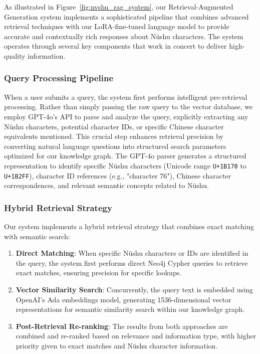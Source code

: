 \documentclass{article}
\begin{document}
    As illustrated in Figure~\ref{fig:nvshu_rag_system}, our Retrieval-Augmented Generation system implements a sophisticated pipeline that combines advanced retrieval techniques with our LoRA-fine-tuned language model to provide accurate and contextually rich responses about N\"{u}shu characters. 
    The system operates through several key components that work in concert to deliver high-quality information.
    
    \subsubsection{Query Processing Pipeline}
    When a user submits a query, the system first performs intelligent pre-retrieval processing. 
    Rather than simply passing the raw query to the vector database, we employ GPT-4o's API to parse and analyze the query, explicitly extracting any N\"{u}shu characters, potential character IDs, or specific Chinese character equivalents mentioned. 
    This crucial step enhances retrieval precision by converting natural language questions into structured search parameters optimized for our knowledge graph.
    The GPT-4o parser generates a structured representation to identify specific N\"{u}shu characters (Unicode range \texttt{U+1B170} to \texttt{U+1B2FF}), character ID references (e.g., "character 76"), Chinese character correspondences, and relevant semantic concepts related to N\"{u}shu.
    
    \subsubsection{Hybrid Retrieval Strategy}
    Our system implements a hybrid retrieval strategy that combines exact matching with semantic search:
    \begin{enumerate}
        \item \textbf{Direct Matching}: When specific N\"{u}shu characters or IDs are identified in the query, the system first performs direct Neo4j Cypher queries to retrieve exact matches, ensuring precision for specific lookups.
        
        \item \textbf{Vector Similarity Search}: Concurrently, the query text is embedded using OpenAI's Ada embeddings model, generating 1536-dimensional vector representations for semantic similarity search within our knowledge graph.
        
        \item \textbf{Post-Retrieval Re-ranking}: The results from both approaches are combined and re-ranked based on relevance and information type, with higher priority given to exact matches and N\"{u}shu character information.
    \end{enumerate}
    
\end{document}

